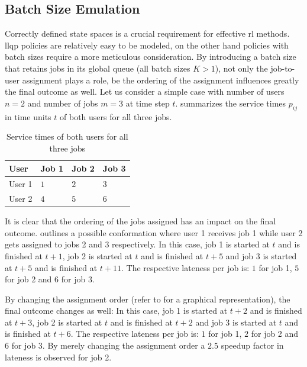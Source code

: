 \documentclass[draft=false]{seal_thesis}
\begin{document}
\subsection{Batch Size Emulation}
\label{subsec:batch_size_emulation}

Correctly defined state spaces is a crucial requirement for effective \gls{rl} methods. \gls{llqp} policies are relatively easy to be modeled, on the other hand policies with batch sizes require a more meticulous consideration. By introducing a batch size that retains jobs in its global queue (\ie all batch sizes $K>1$), not only the job-to-user assignment plays a role, be the ordering of the assignment influences greatly the final outcome as well. Let us consider a simple case with number of users $n=2$ and number of jobs $m=3$ at time step $t$.  summarizes the service times $p_{ij}$ in time units $t$ of both users for all three jobs.

\begin{table}[!ht]
\centering
\begin{tabular}{@{}llll@{}}
\toprule
User   & Job 1 & Job 2 & Job 3 \\ \midrule
User 1 & $1$     & $2$     & $3$     \\
User 2 & $4$     & $5$     & $6$     \\ \bottomrule
\end{tabular}
\caption{Service times of both users for all three jobs}
\label{tab:users_service_times_example}
\end{table}

It is clear that the ordering of the jobs assigned has an impact on the final outcome.  outlines a possible conformation where user 1 receives job 1 while user 2 gets assigned to jobs 2 and 3 respectively. In this case, job 1 is started at $t$ and is finished at $t+1$, job 2 is started at $t$ and is finished at $t+5$ and job 3 is started at $t+5$ and is finished at $t+11$. The respective lateness per job is: $1$ for job 1, $5$ for job 2 and $6$ for job $3$.

By changing the assignment order (refer to  for a graphical representation), the final outcome changes as well: In this case, job 1 is started at $t+2$ and is finished at $t+3$, job 2 is started at $t$ and is finished at $t+2$ and job 3 is started at $t$ and is finished at $t+6$. The respective lateness per job is: $1$ for job 1, $2$ for job 2 and $6$ for job $3$. By merely changing the assignment order a $2.5$ speedup factor in lateness is observed for job 2.
\end{document}

